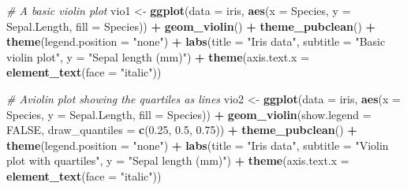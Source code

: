 \documentclass[english,10pt,a4paper,oneside]{book}
\newenvironment{Shaded}{\begin{snugshade}}{\end{snugshade}}
\newcommand{\KeywordTok}[1]{\textcolor[rgb]{0.13,0.29,0.53}{\textbf{#1}}}
\newcommand{\DataTypeTok}[1]{\textcolor[rgb]{0.13,0.29,0.53}{#1}}
\newcommand{\FloatTok}[1]{\textcolor[rgb]{0.00,0.00,0.81}{#1}}
\newcommand{\StringTok}[1]{\textcolor[rgb]{0.31,0.60,0.02}{#1}}
\newcommand{\CommentTok}[1]{\textcolor[rgb]{0.56,0.35,0.01}{\textit{#1}}}
\newcommand{\OtherTok}[1]{\textcolor[rgb]{0.56,0.35,0.01}{#1}}
\newcommand{\OperatorTok}[1]{\textcolor[rgb]{0.81,0.36,0.00}{\textbf{#1}}}
\newcommand{\NormalTok}[1]{#1}
\theoremstyle{definition}
\theoremstyle{definition}
\theoremstyle{definition}
\theoremstyle{remark}
\begin{document}
\begin{Shaded}
\begin{Highlighting}[]
\CommentTok{# A basic violin plot}
\NormalTok{vio1 <-}\StringTok{ }\KeywordTok{ggplot}\NormalTok{(}\DataTypeTok{data =}\NormalTok{ iris, }\KeywordTok{aes}\NormalTok{(}\DataTypeTok{x =}\NormalTok{ Species, }\DataTypeTok{y =}\NormalTok{ Sepal.Length, }\DataTypeTok{fill =}\NormalTok{ Species)) }\OperatorTok{+}
\StringTok{  }\KeywordTok{geom_violin}\NormalTok{() }\OperatorTok{+}\StringTok{ }
\StringTok{  }\KeywordTok{theme_pubclean}\NormalTok{() }\OperatorTok{+}\StringTok{ }\KeywordTok{theme}\NormalTok{(}\DataTypeTok{legend.position =} \StringTok{"none"}\NormalTok{) }\OperatorTok{+}
\StringTok{  }\KeywordTok{labs}\NormalTok{(}\DataTypeTok{title =} \StringTok{"Iris data"}\NormalTok{,}
       \DataTypeTok{subtitle =} \StringTok{"Basic violin plot"}\NormalTok{, }\DataTypeTok{y =} \StringTok{"Sepal length (mm)"}\NormalTok{) }\OperatorTok{+}
\StringTok{  }\KeywordTok{theme}\NormalTok{(}\DataTypeTok{axis.text.x =} \KeywordTok{element_text}\NormalTok{(}\DataTypeTok{face =} \StringTok{"italic"}\NormalTok{))}

\CommentTok{# Aviolin plot showing the quartiles as lines}
\NormalTok{vio2 <-}\StringTok{ }\KeywordTok{ggplot}\NormalTok{(}\DataTypeTok{data =}\NormalTok{ iris, }\KeywordTok{aes}\NormalTok{(}\DataTypeTok{x =}\NormalTok{ Species, }\DataTypeTok{y =}\NormalTok{ Sepal.Length, }\DataTypeTok{fill =}\NormalTok{ Species)) }\OperatorTok{+}
\StringTok{  }\KeywordTok{geom_violin}\NormalTok{(}\DataTypeTok{show.legend =} \OtherTok{FALSE}\NormalTok{, }\DataTypeTok{draw_quantiles =} \KeywordTok{c}\NormalTok{(}\FloatTok{0.25}\NormalTok{, }\FloatTok{0.5}\NormalTok{, }\FloatTok{0.75}\NormalTok{)) }\OperatorTok{+}\StringTok{ }
\StringTok{  }\KeywordTok{theme_pubclean}\NormalTok{() }\OperatorTok{+}\StringTok{ }\KeywordTok{theme}\NormalTok{(}\DataTypeTok{legend.position =} \StringTok{"none"}\NormalTok{) }\OperatorTok{+}
\StringTok{  }\KeywordTok{labs}\NormalTok{(}\DataTypeTok{title =} \StringTok{"Iris data"}\NormalTok{,}
       \DataTypeTok{subtitle =} \StringTok{"Violin plot with quartiles"}\NormalTok{, }\DataTypeTok{y =} \StringTok{"Sepal length (mm)"}\NormalTok{) }\OperatorTok{+}
\StringTok{  }\KeywordTok{theme}\NormalTok{(}\DataTypeTok{axis.text.x =} \KeywordTok{element_text}\NormalTok{(}\DataTypeTok{face =} \StringTok{"italic"}\NormalTok{))}


\end{Highlighting}
\end{Shaded}
\end{document}
